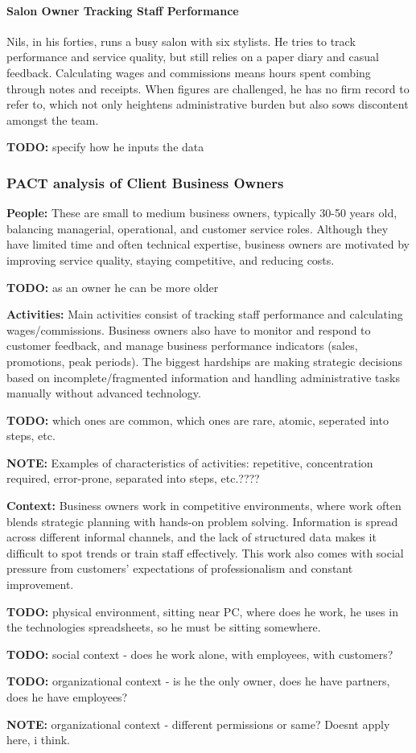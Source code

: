 \documentclass[]{VUMIFTemplateClass}
\newcommand{\noticecomment}[1]{%
    \begin{tcolorbox}[colback=blue!20, colframe=blue!60, arc=0pt, outer arc=0pt, boxrule=1pt, left=3pt, right=3pt, top=3pt, bottom=3pt]
        \textbf{\textcolor{blue!70!black}{NOTE:}} #1
    \end{tcolorbox}
}
\newcommand{\todocomment}[1]{%
    \begin{tcolorbox}[colback=red!20, colframe=red!60, arc=0pt, outer arc=0pt, boxrule=1pt, left=3pt, right=3pt, top=3pt, bottom=3pt]
        \textbf{\textcolor{orange!70!black}{TODO:}} #1
    \end{tcolorbox}
}
\newcommand{\subsubsubsection}[1]{\paragraph{#1}}
\begin{document}
\subsubsubsection{Salon Owner Tracking Staff Performance}

Nils, in his forties, runs a busy salon with six stylists. He tries to track
performance and service quality, but still relies on a paper diary and casual
feedback. Calculating wages and commissions means hours spent combing through
notes and receipts. When figures are challenged, he has no firm record to refer
to, which not only heightens administrative burden but also sows discontent
amongst the team.
\todocomment{specify how he inputs the data}

\subsubsection{PACT analysis of Client Business Owners}
    \textbf{People:} These are small to medium business owners, typically 30-50
    years old, balancing managerial, operational, and customer service roles.
    Although they have limited time and often technical expertise, business
    owners are motivated by improving service quality, staying competitive, and
    reducing costs.

    \todocomment{as an owner he can be more older}

    \textbf{Activities:} Main activities consist of tracking staff performance
    and calculating wages/commissions. Business owners also have to monitor and
    respond to customer feedback, and manage business performance indicators
    (sales, promotions, peak periods). The biggest hardships are making
    strategic decisions based on incomplete/fragmented information and handling
    administrative tasks manually without advanced technology.
    \todocomment{which ones are common, which ones are rare, atomic, seperated into steps, etc.}
    \noticecomment{Examples of characteristics of activities: repetitive, concentration required, error-prone, separated into steps, etc.????}

    \textbf{Context:} Business owners work in competitive environments, where
    work often blends strategic planning with hands-on problem solving.
    Information is spread across different informal channels, and the lack of
    structured data makes it difficult to spot trends or train staff
    effectively. This work also comes with social pressure from customers'
    expectations of professionalism and constant improvement.
    \todocomment{physical environment, sitting near PC, where does he work, he uses in the technologies spreadsheets, so he must be sitting somewhere.}
    \todocomment{social context - does he work alone, with employees, with customers?}
    \todocomment{organizational context - is he the only owner, does he have partners, does he have employees?}
    \noticecomment{organizational context - different permissions or same? Doesnt apply here, i think.}
\end{document}
